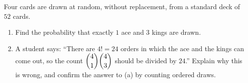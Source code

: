 Four cards are drawn at random, without replacement, from a standard deck of $52$ cards.
\begin{enumerate}
\item[(a)] Find the probability that exactly $1$ ace and $3$ kings are drawn.
\item[(b)] A student says: ``There are $4!=24$ orders in which the ace and the kings can come out, so the count $\dbinom41\dbinom43$ should be divided by $24$.'' Explain why this is wrong, and confirm the answer to (a) by counting ordered draws.
\end{enumerate}
